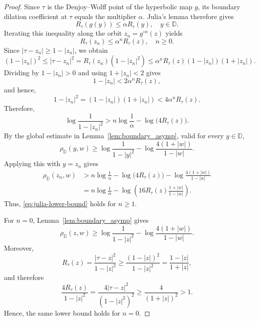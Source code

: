 \documentclass[12pt]{amsart}
\numberwithin{equation}{section}
\theoremstyle{plain}
\theoremstyle{definition}
\begin{document}
\begin{proof}
Since $\tau$ is the Denjoy--Wolff point of the hyperbolic map $g$,
its boundary dilation coefficient at $\tau$ equals the multiplier
$\alpha$. Julia's lemma therefore gives
\begin{equation*}
R_\tau(g(y))\leq \alpha R_\tau(y),
\quad y\in\mathbb{D}.
\end{equation*}
Iterating this inequality along the orbit
$z_n=g^{\circ n}(z)$ yields
\begin{equation*}
R_\tau(z_n)\leq \alpha^n R_\tau(z),
\quad n\geq0.
\end{equation*}
Since $|\tau-z_n|\geq1-|z_n|$, we obtain
\begin{equation*}
(1-|z_n|)^2
\leq |\tau-z_n|^2
=R_\tau(z_n)(1-|z_n|^2)
\leq \alpha^nR_\tau(z)(1-|z_n|)(1+|z_n|).
\end{equation*}
Dividing by $1-|z_n|>0$ and using $1+|z_n|<2$ gives
\begin{equation*}
1-|z_n|<2\alpha^nR_\tau(z),
\end{equation*}
and hence,
\begin{equation*}
1-|z_n|^2
=
(1-|z_n|)(1+|z_n|)
<
4\alpha^nR_\tau(z).
\end{equation*}
Therefore,
\begin{equation*}
\log\frac{1}{1-|z_n|^2}
>
n\log\frac{1}{\alpha}
-
\log\bigl(4R_\tau(z)\bigr).
\end{equation*}
By the global estimate in
Lemma~\ref{lem:boundary_asymp}, valid for every $y\in\mathbb{D}$,
\begin{equation*}
\rho_{\mathbb{D}}(y,w)
\geq
\log\frac{1}{1-|y|^2}
-
\log\frac{4(1+|w|)}{1-|w|}.
\end{equation*}
Applying this with $y=z_n$ gives
\begin{align*}
\rho_{\mathbb{D}}(z_n,w)
&>
n\log\frac{1}{\alpha}
-\log\bigl(4R_\tau(z)\bigr)
-\log\frac{4(1+|w|)}{1-|w|}\\
&=
n\log\frac{1}{\alpha}
-
\log\left(
16R_\tau(z)\frac{1+|w|}{1-|w|}
\right).
\end{align*}
Thus, \eqref{eq:julia-lower-bound} holds for $n\geq1$.

For $n=0$, Lemma~\ref{lem:boundary_asymp} gives
\begin{equation*}
\rho_{\mathbb{D}}(z,w)
\geq
\log\frac{1}{1-|z|^2}
-
\log\frac{4(1+|w|)}{1-|w|}.
\end{equation*}
Moreover,
\begin{equation*}
R_\tau(z)
=
\frac{|\tau-z|^2}{1-|z|^2}
\geq
\frac{(1-|z|)^2}{1-|z|^2}
=
\frac{1-|z|}{1+|z|},
\end{equation*}
and therefore
\begin{equation*}
\frac{4R_\tau(z)}{1-|z|^2}
=
\frac{4|\tau-z|^2}{(1-|z|^2)^2}
\geq
\frac{4}{(1+|z|)^2}
>1.
\end{equation*}
Hence, the same lower bound holds for $n=0$.
\end{proof}
\end{document}
